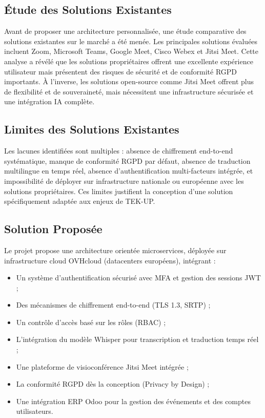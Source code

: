 \subsection{Étude des Solutions Existantes}
Avant de proposer une architecture personnalisée, une étude comparative des solutions existantes sur le marché a été menée. Les principales solutions évaluées incluent Zoom, Microsoft Teams, Google Meet, Cisco Webex et Jitsi Meet. Cette analyse a révélé que les solutions propriétaires offrent une excellente expérience utilisateur mais présentent des risques de sécurité et de conformité RGPD importants. À l'inverse, les solutions open-source comme Jitsi Meet offrent plus de flexibilité et de souveraineté, mais nécessitent une infrastructure sécurisée et une intégration IA complète.

\subsection{Limites des Solutions Existantes}
Les lacunes identifiées sont multiples : absence de chiffrement end-to-end systématique, manque de conformité RGPD par défaut, absence de traduction multilingue en temps réel, absence d'authentification multi-facteurs intégrée, et impossibilité de déployer sur infrastructure nationale ou européenne avec les solutions propriétaires. Ces limites justifient la conception d'une solution spécifiquement adaptée aux enjeux de TEK-UP.

\subsection{Solution Proposée}
Le projet propose une architecture orientée microservices, déployée sur infrastructure cloud OVHcloud (datacenters européens), intégrant :
\begin{itemize}
    \item Un système d'authentification sécurisé avec MFA et gestion des sessions JWT ;
    \item Des mécanismes de chiffrement end-to-end (TLS 1.3, SRTP) ;
    \item Un contrôle d'accès basé sur les rôles (RBAC) ;
    \item L'intégration du modèle Whisper pour transcription et traduction temps réel ;
    \item Une plateforme de visioconférence Jitsi Meet intégrée ;
    \item La conformité RGPD dès la conception (Privacy by Design) ;
    \item Une intégration ERP Odoo pour la gestion des événements et des comptes utilisateurs.
\end{itemize}

